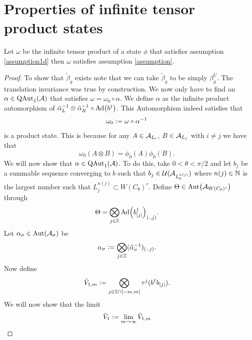 \documentclass[11pt,a4paper,twoside]{article}
\numberwithin{equation}{section}
\begin{document}
	\section{Properties of infinite tensor product states}
	\begin{lemma}\label{lem:TensorProductStateHasWellDefinedH^2IndexAppendix}
		Let $\omega$ be the infinite tensor product of a state $\phi$ that satisfies assumption \ref{assumption1d} then $\omega$ satisfies assumption \ref{assumption}.
	\end{lemma}
	\begin{proof}
		To show that $\tilde{\beta}_g$ exists note that we can take $\tilde{\beta}_g$ to be simply $\beta_g^{U}$. The translation invariance was true by construction. We now only have to find an $\alpha\in\QAut{\AA}$ that satisfies $\omega=\omega_0\circ\alpha$. We define $\alpha$ as the infinite product automorphism of $\tilde{\alpha}_L^{-1}\otimes\tilde{\alpha}_R^{-1}\circ\Ad{b^\dagger}$. This Automorphism indeed satisfies that
		\begin{equation}
			\omega_0\defeq \omega\circ\alpha^{-1}
		\end{equation}
		is a product state. This is because for any $A\in\AA_{L_{i}}$, $B\in\AA_{L_{j}}$ with $i\neq j$ we have that
		\begin{equation}
			\omega_0(A\otimes B)=\phi_0(A)\phi_0(B).
		\end{equation}
		We will now show that $\alpha\in\QAut{\AA}$. To do this, take $0<\theta<\pi/2$ and let $b_j$ be a summable sequence converging to $b$ such that $b_j\in\UU(\AA_{L_0^{n(j)}})$ where $n(j)\in\NN$ is the largest number such that $L_{j}^{n(j)}\subset W(C_\theta)^c$. Define $\Theta\in\Aut{\AA_{W(C_\theta)^c}}$ through
		\begin{equation}
			\Theta=\bigotimes_{j\in\ZZ}\Ad{b_\abs{j}^\dagger}_{(\cdot,j)}.
		\end{equation}
		Let $\alpha_\sigma\in\Aut{\AA_\sigma}$ be
		\begin{equation}
			\alpha_\sigma\defeq \bigotimes_{j\in\ZZ}(\tilde\alpha_\sigma^{-1})_{(\cdot,j)}.
		\end{equation}
		Now define
		\begin{equation}
			\tilde V_{1,m}\defeq\bigotimes_{j\in\ZZ\cap[-m,m]}\tau^j (b^\dagger b_\abs{j}).
		\end{equation}
		We will now show that the limit
		\begin{equation}
			\tilde V_1\defeq\lim_{m\rightarrow\infty}\tilde V_{1,m}
		\end{equation}

\end{proof}
\end{document}
